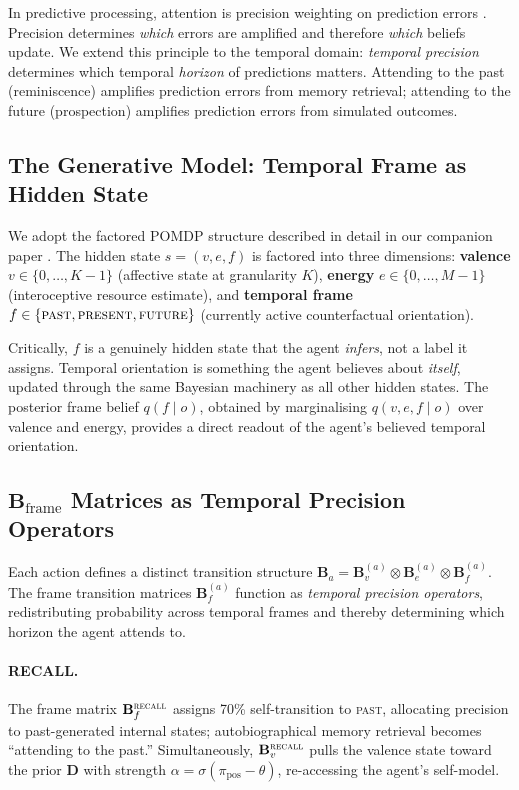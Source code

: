 \documentclass[11pt,a4paper]{article}
\begin{document}
In predictive processing, attention is precision weighting on prediction errors \citep{feldman2010attention}. Precision determines \emph{which} errors are amplified and therefore \emph{which} beliefs update. We extend this principle to the temporal domain: \emph{temporal precision} determines which temporal \emph{horizon} of predictions matters. Attending to the past (reminiscence) amplifies prediction errors from memory retrieval; attending to the future (prospection) amplifies prediction errors from simulated outcomes.

\subsection{The Generative Model: Temporal Frame as Hidden State}\label{sec:gen_model}

We adopt the factored POMDP structure described in detail in our companion paper \citep{albarracin2026bipolar}. The hidden state $s = (v, e, f)$ is factored into three dimensions: \textbf{valence} $v \in \{0, \ldots, K{-}1\}$ (affective state at granularity $K$), \textbf{energy} $e \in \{0, \ldots, M{-}1\}$ (interoceptive resource estimate), and \textbf{temporal frame} $f \in \{\textsc{past}, \textsc{present}, \textsc{future}\}$ (currently active counterfactual orientation).

Critically, $f$ is a genuinely hidden state that the agent \emph{infers}, not a label it assigns. Temporal orientation is something the agent believes about \emph{itself}, updated through the same Bayesian machinery as all other hidden states. The posterior frame belief $q(f \mid o)$, obtained by marginalising $q(v, e, f \mid o)$ over valence and energy, provides a direct readout of the agent's believed temporal orientation.

\subsection{$\mathbf{B}_{\text{frame}}$ Matrices as Temporal Precision Operators}\label{sec:b_frame}

Each action defines a distinct transition structure $\mathbf{B}_a = \mathbf{B}_v^{(a)} \otimes \mathbf{B}_e^{(a)} \otimes \mathbf{B}_f^{(a)}$. The frame transition matrices $\mathbf{B}_f^{(a)}$ function as \emph{temporal precision operators}, redistributing probability across temporal frames and thereby determining which horizon the agent attends to.

\paragraph{RECALL.} The frame matrix $\mathbf{B}_f^{\textsc{recall}}$ assigns 70\% self-transition to \textsc{past}, allocating precision to past-generated internal states; autobiographical memory retrieval becomes ``attending to the past.'' Simultaneously, $\mathbf{B}_v^{\textsc{recall}}$ pulls the valence state toward the prior $\mathbf{D}$ with strength $\alpha = \sigma(\pi_{\text{pos}} - \theta)$, re-accessing the agent's self-model.
\end{document}
